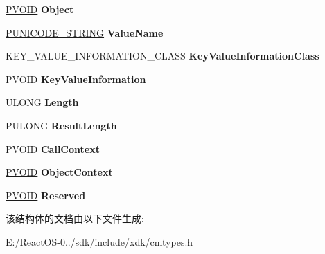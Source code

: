 \begin{DoxyCompactItemize}
\item 
\mbox{\label{struct___r_e_g___q_u_e_r_y___v_a_l_u_e___k_e_y___i_n_f_o_r_m_a_t_i_o_n_abc94ed7fa8efd631dcf7e63ba01af358}} 
\hyperlink{interfacevoid}{P\+V\+O\+ID} {\bfseries Object}
\item 
\mbox{\label{struct___r_e_g___q_u_e_r_y___v_a_l_u_e___k_e_y___i_n_f_o_r_m_a_t_i_o_n_a1bcee927152e09ab47bf523d103f7975}} 
\hyperlink{struct___u_n_i_c_o_d_e___s_t_r_i_n_g}{P\+U\+N\+I\+C\+O\+D\+E\+\_\+\+S\+T\+R\+I\+NG} {\bfseries Value\+Name}
\item 
\mbox{\label{struct___r_e_g___q_u_e_r_y___v_a_l_u_e___k_e_y___i_n_f_o_r_m_a_t_i_o_n_a721a1f430b81ca6b7d5ffae893cef7ea}} 
K\+E\+Y\+\_\+\+V\+A\+L\+U\+E\+\_\+\+I\+N\+F\+O\+R\+M\+A\+T\+I\+O\+N\+\_\+\+C\+L\+A\+SS {\bfseries Key\+Value\+Information\+Class}
\item 
\mbox{\label{struct___r_e_g___q_u_e_r_y___v_a_l_u_e___k_e_y___i_n_f_o_r_m_a_t_i_o_n_ae5958bdd840190d4d08acd2335c5ea40}} 
\hyperlink{interfacevoid}{P\+V\+O\+ID} {\bfseries Key\+Value\+Information}
\item 
\mbox{\label{struct___r_e_g___q_u_e_r_y___v_a_l_u_e___k_e_y___i_n_f_o_r_m_a_t_i_o_n_ad61cc41d2de23b39cca87d767f7e5182}} 
U\+L\+O\+NG {\bfseries Length}
\item 
\mbox{\label{struct___r_e_g___q_u_e_r_y___v_a_l_u_e___k_e_y___i_n_f_o_r_m_a_t_i_o_n_a7efcbe9fd46249e1626328324efc8286}} 
P\+U\+L\+O\+NG {\bfseries Result\+Length}
\item 
\mbox{\label{struct___r_e_g___q_u_e_r_y___v_a_l_u_e___k_e_y___i_n_f_o_r_m_a_t_i_o_n_ab7c1f535a0dcf9e1ea14ede807ec7e73}} 
\hyperlink{interfacevoid}{P\+V\+O\+ID} {\bfseries Call\+Context}
\item 
\mbox{\label{struct___r_e_g___q_u_e_r_y___v_a_l_u_e___k_e_y___i_n_f_o_r_m_a_t_i_o_n_ac5a0896e0154b4c15f088f9986b1a258}} 
\hyperlink{interfacevoid}{P\+V\+O\+ID} {\bfseries Object\+Context}
\item 
\mbox{\label{struct___r_e_g___q_u_e_r_y___v_a_l_u_e___k_e_y___i_n_f_o_r_m_a_t_i_o_n_af432b247338817f7e044528e8ef104a0}} 
\hyperlink{interfacevoid}{P\+V\+O\+ID} {\bfseries Reserved}
\end{DoxyCompactItemize}


该结构体的文档由以下文件生成\+:\begin{DoxyCompactItemize}
\item 
E\+:/\+React\+O\+S-\/0../sdk/include/xdk/cmtypes.\+h\end{DoxyCompactItemize}
